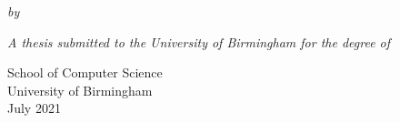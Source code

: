 \begingroup

\thispagestyle{empty}
\vspace*{\fill}\vspace*{\fill}
\setlength\parskip{\fill}
\centering\large\sffamily

{\huge{}}

\emph{by}


\emph{A thesis submitted to the University of Birmingham for the degree of}\\

\raggedleft
School of Computer Science\\
University of Birmingham\\
July 2021

\vspace*{\fill}\vspace*{\fill}

\par\endgroup
